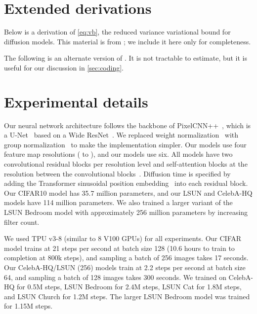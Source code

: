 \documentclass{article}
\begin{document}
\section{Extended derivations}
\label{sec:extended_derivations}

Below is a derivation of \cref{eq:vb}, the reduced variance variational bound for diffusion models. This material is from \citet{sohl2015deep}; we include it here only for completeness.
\begingroup
\allowdisplaybreaks

The following is an alternate version of . It is not tractable to estimate, but it is useful for our discussion in \cref{sec:coding}.

\endgroup


\section{Experimental details}
\label{sec:experiment_details}

Our neural network architecture follows the backbone of PixelCNN++~\citep{salimans2017pixelcnn++}, which is a U-Net~\citep{ronneberger2015unet} based on a Wide ResNet~\citep{zagoruyko2016wide}. We replaced weight normalization~\citep{salimans2016weight} with group normalization~\citep{wu2018group} to make the implementation simpler. Our  models use four feature map resolutions ( to ), and our  models use six. All models have two convolutional residual blocks per resolution level and self-attention blocks at the  resolution between the convolutional blocks~\citep{chen2018pixelsnail}. Diffusion time  is specified by adding the Transformer sinusoidal position embedding~\citep{vaswani2017attention} into each residual block. Our CIFAR10 model has 35.7 million parameters, and our LSUN and CelebA-HQ models have 114 million parameters. We also trained a larger variant of the LSUN Bedroom model with approximately 256 million parameters by increasing filter count.

We used TPU v3-8 (similar to 8 V100 GPUs) for all experiments. Our CIFAR model trains at 21 steps per second at batch size 128 (10.6 hours to train to completion at 800k steps), and sampling a batch of 256 images takes 17 seconds.
Our CelebA-HQ/LSUN (256) models train at 2.2 steps per second at batch size 64, and sampling a batch of 128 images takes 300 seconds. We trained on CelebA-HQ for 0.5M steps, LSUN Bedroom for 2.4M steps, LSUN Cat for 1.8M steps, and LSUN Church for 1.2M steps. The larger LSUN Bedroom model was trained for 1.15M steps.
\end{document}

